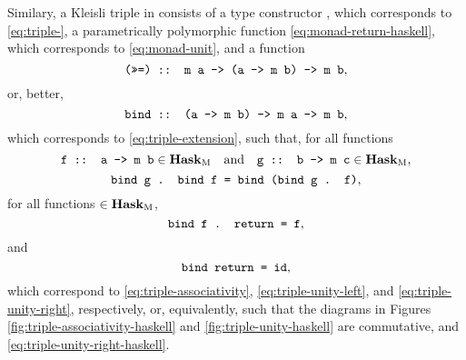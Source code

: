 Similary, a Kleisli triple in \hask consists of a type constructor
, which corresponds to \eqref{eq:triple-}, a
parametrically polymorphic function 
\eqref{eq:monad-return-haskell}, which corresponds to
\eqref{eq:monad-unit}, and a function
\begin{equation}
  \label{eq:triple-alternative-bind-haskell}
  \text{\texttt{(>>=) :: m a -> (a -> m b) -> m b}}
  \text{,}
\end{equation}
or, better,
\begin{equation}
  \label{eq:triple-bind-haskell}
  \text{\texttt{bind :: (a -> m b) -> m a -> m b}}
  \text{,}
\end{equation}
which corresponds to \eqref{eq:triple-extension}, such that, for all
functions
\begin{equation*}
  \text{\texttt{f :: a -> m b}} \in \mathcal{\mathbf{Hask}}_{\operatorname{M}}
  \quad
  \text{and}
  \quad
  \text{\texttt{g :: b -> m c}} \in \mathcal{\mathbf{Hask}}_{\operatorname{M}}
  \text{,}
\end{equation*}
\begin{equation}
  \label{eq:triple-associativity-haskell}
  \text{\texttt{bind g . bind f = bind (bind g . f)}}
  \text{,}
\end{equation}
for all functions  $\in \mathcal{\mathbf{Hask}}_{\operatorname{M}}$,
\begin{equation}
  \label{eq:triple-unity-left-haskell}
  \text{\texttt{bind f . return = f}}
  \text{,}
\end{equation}
and
\begin{equation}
  \label{eq:triple-unity-right-haskell}
  \text{\texttt{bind return = id}}
  \text{,}
\end{equation}
which correspond to \eqref{eq:triple-associativity},
\eqref{eq:triple-unity-left}, and \eqref{eq:triple-unity-right},
respectively, or, equivalently, such that the diagrams in Figures
\ref{fig:triple-associativity-haskell} and
\ref{fig:triple-unity-haskell} are commutative, and
\eqref{eq:triple-unity-right-haskell}.
